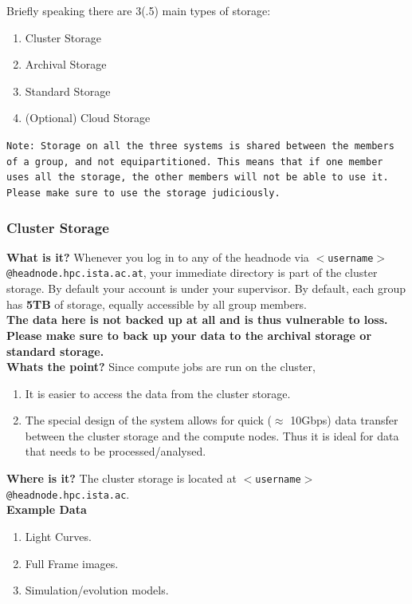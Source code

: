 \documentclass{article}
\begin{document}
Briefly speaking there are 3(.5) main types of storage:
\begin{enumerate}
    \item Cluster Storage
    \item Archival Storage
    \item Standard Storage
    \item (Optional) Cloud Storage
\end{enumerate}

\texttt{Note: Storage on all the three systems is shared between the members of a group, and not equipartitioned. This means that if one member uses all the storage, the other members will not be able to use it. Please make sure to use the storage judiciously.}
\subsubsection{Cluster Storage}
\textbf{What is it?}
\newline
Whenever you log in to any of the headnode via \texttt{$<$username$>$@headnode.hpc.ista.ac.at}, your immediate directory is part of the cluster storage. By default your account is under your supervisor. By default, each group has \textbf{5TB} of storage, equally accessible by all group members.
\\
\textbf{The data here is not backed up at all and is thus vulnerable to loss. Please make sure to back up your data to the archival storage or standard storage.}
\\

\noindent
\textbf{Whats the point?}
\newline
Since compute jobs are run on the cluster, 
\begin{enumerate}
    \item It is easier to access the data from the cluster storage.
    \item The special design of the system allows for quick ($\approx$ 10Gbps) data transfer between the cluster storage and the compute nodes. Thus it is ideal for data that needs to be processed/analysed.
\end{enumerate}

\noindent
\textbf{Where is it?}
\newline
The cluster storage is located at \texttt{$<$username$>$@headnode.hpc.ista.ac}.
\\

\noindent
\textbf{Example Data}
\begin{enumerate}
    \item Light Curves.
    \item Full Frame images.
    \item Simulation/evolution models.
\end{enumerate}
\end{document}
